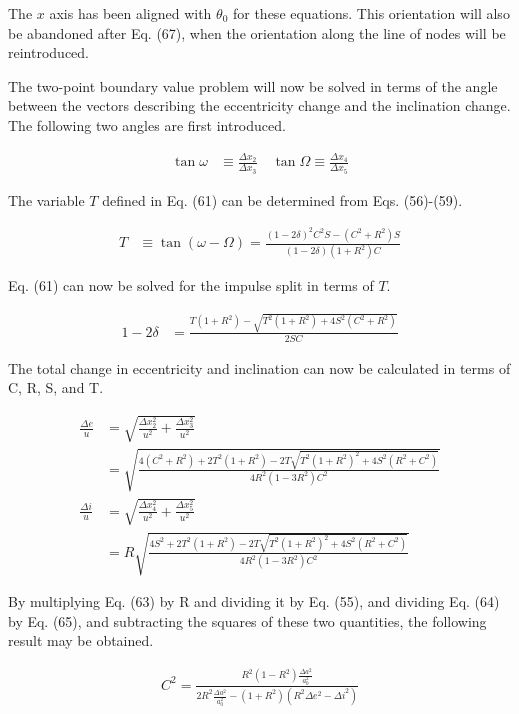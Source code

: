 \documentclass[12pt]{article}
\begin{document}
The $x$ axis has been aligned with $\theta_0$ for these equations. This orientation will also be abandoned after Eq. (67), when the orientation along the line of nodes will be reintroduced.

The two-point boundary value problem will now be solved in terms of the angle between the vectors describing the eccentricity change and the inclination change. The following two angles are first introduced.

\begin{align}
\tan \omega &\equiv \frac{\Delta x_2}{\Delta x_3} \quad \tan \Omega \equiv \frac{\Delta x_4}{\Delta x_5} \tag{60}
\end{align}

The variable $T$ defined in Eq. (61) can be determined from Eqs. (56)-(59).

\begin{align}
T &\equiv \tan (\omega - \Omega) = \frac{(1-2\delta)^2 C^2 S - (C^2 + R^2)S}{(1-2\delta)(1+R^2)C} \tag{61}
\end{align}

Eq. (61) can now be solved for the impulse split in terms of $T$.

\begin{align}
1-2\delta &= \frac{T(1+R^2) - \sqrt{T^2(1+R^2) + 4S^2(C^2 + R^2)}}{2SC} \tag{62}
\end{align}

The total change in eccentricity and inclination can now be calculated in terms of C, R, S, and T.

\begin{align}
\frac{\Delta e}{u} &= \sqrt{\frac{\Delta x_2^2}{u^2} + \frac{\Delta x_3^2}{u^2}} \nonumber \\
&= \sqrt{\frac{4(C^2 + R^2) + 2T^2(1+R^2) - 2T\sqrt{T^2(1+R^2)^2 + 4S^2(R^2 + C^2)}}{4R^2(1-3R^2)C^2}} \tag{63} \\
\frac{\Delta i}{u} &= \sqrt{\frac{\Delta x_4^2}{u^2} + \frac{\Delta x_5^2}{u^2}} \nonumber \\
&= R \sqrt{\frac{4S^2 + 2T^2(1+R^2) - 2T\sqrt{T^2(1+R^2)^2 + 4S^2(R^2 + C^2)}}{4R^2(1-3R^2)C^2}} \tag{64}
\end{align}

By multiplying Eq. (63) by R and dividing it by Eq. (55), and dividing Eq. (64) by Eq. (65), and subtracting the squares of these two quantities, the following result may be obtained.

\begin{align}
C^2 = \frac{R^2(1-R^2)\frac{\Delta a^2}{a_0^2}}{2R^2\frac{\Delta a^2}{a_0^2} - (1+R^2)(R^2\Delta e^2 - \Delta i^2)} \tag{65}
\end{align}
\end{document}
